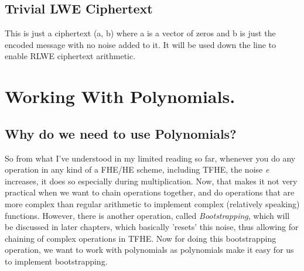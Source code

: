 \documentclass{report}
\begin{document}
\section{Trivial LWE Ciphertext}
This is just a ciphertext (a, b) where a is a vector of zeros and b is just the encoded message with no noise added to it. It will be used down the line to enable RLWE ciphertext arithmetic.

\chapter{Working With Polynomials.}
	\section{Why do we need to use Polynomials?}
		So from what I've understood in my limited reading so far, whenever you do any operation in any kind of a FHE/HE scheme, including TFHE, the noise \textit{e} increases, it does so especially during multiplication. Now, that makes it not very practical when we want to chain operations together, and do operations that are more complex than regular arithmetic to  implement complex (relatively speaking) functions. However, there is another operation, called \textit{Bootstrapping}, which will be discussed in later chapters, which basically 'resets' this noise, thus allowing for chaining of complex operations in TFHE. Now for doing this bootstrapping operation, we want to work with polynomials as polynomials make it easy for us to implement bootstrapping.
		
\end{document}
